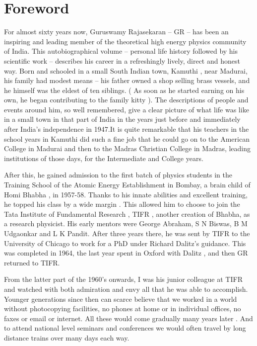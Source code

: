 \chapter*{Foreword}


For almost sixty years now, Guruswamy Rajasekaran – GR – has been an 
inspiring and leading member of the theoretical high energy physics 
community of India. This autobiographical volume – personal life 
history followed by his scientific work – describes his career in a 
refreshingly lively, direct and honest way. Born and schooled in a 
small South Indian town, Kamuthi , near Madurai, his family had modest 
means – his father owned a shop selling brass vessels, and he himself 
was the eldest of ten siblings. ( As soon as he started earning on his 
own, he began contributing to the family kitty ). The descriptions of 
people and events around him, so well remembered, give a clear picture 
of what life was like in a small town in that part of India in the 
years just before and immediately after India’s independence in 1947.It 
is quite remarkable that his teachers in the school years in Kamuthi 
did such a fine job that he could go on to the American College in 
Madurai and then to the Madras Christian College in Madras, leading 
institutions of those days, for the Intermediate and College years.

After this, he gained admission to the first batch of physics students 
in the Training School of the Atomic Energy Establishment in Bombay, a 
brain child of Homi Bhabha , in 1957-58. Thanks to his innate abilities 
and excellent training, he topped his class by a wide margin . This 
allowed him to choose to join the Tata Institute of Fundamental 
Research , TIFR , another creation of Bhabha, as a research physicist. 
His early mentors were George Abraham, S N Biswas, B M Udgaonkar and L 
K Pandit. After three years there, he was sent by TIFR to the 
University of Chicago to work for a PhD under Richard Dalitz’s 
guidance. This was completed in 1964, the last year spent in Oxford 
with Dalitz , and then GR returned to TIFR.
\eject

From the latter part of the 1960’s onwards, I was his junior colleague 
at TIFR and watched with both admiration and envy all that he was able 
to accomplish. Younger generations since then can scarce believe that 
we worked in a world without photocopying facilities, no phones at home 
or in individual offices, no faxes or email or internet. All these 
would come gradually many years later . And to attend national level 
seminars and conferences we would often travel by long distance trains 
over many days each way.

